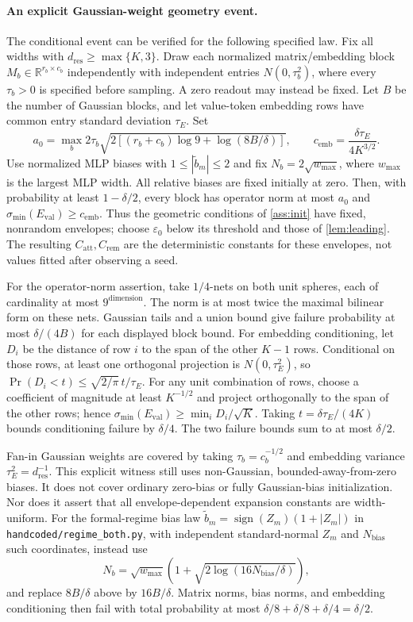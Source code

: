 \paragraph{An explicit Gaussian-weight geometry event.}
\label{app:t2-gaussian-geometry}
The conditional event can be verified for the following specified law.
Fix all widths with $d_{\mathrm{res}}\ge\max\{K,3\}$. Draw each normalized
matrix/embedding block $M_b\in\mathbb R^{r_b\times c_b}$ independently
with independent entries $N(0,\tau_b^2)$, where every $\tau_b>0$ is
specified before sampling. A zero readout may instead be fixed. Let $B$
be the number of Gaussian blocks, and let value-token embedding rows
have common entry standard deviation $\tau_E$. Set
\[
 a_0=\max_b 2\tau_b\sqrt{2[(r_b+c_b)\log9+\log(8B/\delta)]},\qquad
 c_{\mathrm{emb}}=\frac{\delta\tau_E}{4K^{3/2}}.
\]
Use normalized MLP biases with $1\le|\tilde b_m|\le2$ and fix
$N_b=2\sqrt{w_{\max}}$, where $w_{\max}$ is the largest MLP width.
All relative biases are fixed initially at zero. Then, with probability
at least $1-\delta/2$, every block has operator norm at most $a_0$ and
$\sigma_{\min}(E_{\mathrm{val}})\ge c_{\mathrm{emb}}$. Thus the geometric
conditions of \cref{ass:init} have fixed, nonrandom envelopes; choose
$\varepsilon_0$ below its threshold and those of \cref{lem:leading}.
The resulting $C_{\mathrm{att}},C_{\mathrm{rem}}$ are the deterministic
constants for these envelopes, not values fitted after observing a seed.

For the operator-norm assertion, take $1/4$-nets on both unit spheres,
each of cardinality at most $9^{\mathrm{dimension}}$. The norm is at most
twice the maximal bilinear form on these nets. Gaussian tails and a union
bound give failure probability at most $\delta/(4B)$ for each displayed
block bound. For embedding conditioning, let $D_i$ be the distance of
row $i$ to the span of the other $K-1$ rows. Conditional on those rows,
at least one orthogonal projection is $N(0,\tau_E^2)$, so
$\Pr(D_i<t)\le\sqrt{2/\pi}\,t/\tau_E$. For any unit combination of rows,
choose a coefficient of magnitude at least $K^{-1/2}$ and project
orthogonally to the span of the other rows; hence
$\sigma_{\min}(E_{\mathrm{val}})\ge\min_i D_i/\sqrt K$.
Taking $t=\delta\tau_E/(4K)$ bounds conditioning failure by $\delta/4$.
The two failure bounds sum to at most $\delta/2$.

Fan-in Gaussian weights are covered by taking $\tau_b=c_b^{-1/2}$ and
embedding variance $\tau_E^2=d_{\mathrm{res}}^{-1}$. This explicit witness
still uses non-Gaussian, bounded-away-from-zero biases. It does not cover
ordinary zero-bias or fully Gaussian-bias initialization. Nor does it
assert that all envelope-dependent expansion constants are width-uniform.
For the formal-regime bias law $\tilde b_m=\operatorname{sign}(Z_m)(1+|Z_m|)$
in \nolinkurl{handcoded/regime_both.py}, with independent standard-normal
$Z_m$ and $N_{\mathrm{bias}}$ such coordinates, instead use
\[
 N_b=\sqrt{w_{\max}}\left(1+\sqrt{2\log(16N_{\mathrm{bias}}/\delta)}\right),
\]
and replace $8B/\delta$ above by $16B/\delta$. Matrix norms, bias norms,
and embedding conditioning then fail with total probability at most
$\delta/8+\delta/8+\delta/4=\delta/2$.
